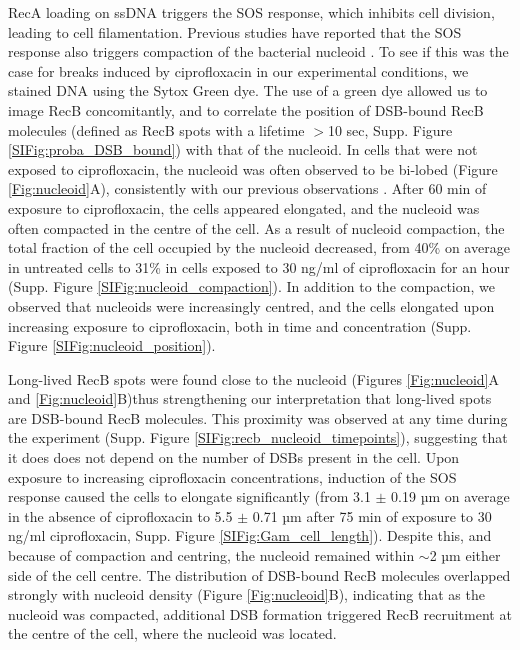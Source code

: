 RecA loading on ssDNA triggers the SOS response, which inhibits cell division, leading to cell filamentation. Previous studies have reported that the SOS response also triggers compaction of the bacterial nucleoid \cite{Odsbu2014}. To see if this was the case for breaks induced by ciprofloxacin in our experimental conditions, we stained DNA using the Sytox Green dye. The use of a green dye allowed us to image RecB concomitantly, and to correlate the position of DSB-bound RecB molecules (defined as RecB spots with a lifetime $>$10 sec, Supp. Figure \ref{SIFig:proba_DSB_bound}) with that of the nucleoid. In cells that were not exposed to ciprofloxacin, the nucleoid was often observed to be bi-lobed (Figure \ref{Fig:nucleoid}A), consistently with our previous observations \cite{Lepore2025}. After 60 min of exposure to ciprofloxacin, the cells appeared elongated, and the nucleoid was often compacted in the centre of the cell. As a result of nucleoid compaction, the total fraction of the cell occupied by the nucleoid decreased, from 40\% on average in untreated cells to 31\% in cells exposed to 30 ng/ml of ciprofloxacin for an hour (Supp. Figure \ref{SIFig:nucleoid_compaction}). In addition to the compaction, we observed that nucleoids were increasingly centred, and the cells elongated upon increasing exposure to ciprofloxacin, both in time and concentration (Supp. Figure \ref{SIFig:nucleoid_position}).

Long-lived RecB spots were found close to the nucleoid (Figures \ref{Fig:nucleoid}A and \ref{Fig:nucleoid}B)thus strengthening our interpretation that long-lived spots are DSB-bound RecB molecules. This proximity was observed at any time during the experiment (Supp. Figure \ref{SIFig:recb_nucleoid_timepoints}), suggesting that it does does not depend on the number of DSBs present in the cell. Upon exposure to increasing ciprofloxacin concentrations, induction of the SOS response caused the cells to elongate significantly (from 3.1 $\pm$ 0.19 µm on average in the absence of ciprofloxacin to 5.5 $\pm$ 0.71 µm after 75 min of exposure to 30 ng/ml ciprofloxacin, Supp. Figure \ref{SIFig:Gam_cell_length}). Despite this, and because of compaction and centring, the nucleoid remained within $\sim$2 µm either side of the cell centre. The distribution of DSB-bound RecB molecules overlapped strongly with nucleoid density (Figure \ref{Fig:nucleoid}B), indicating that as the nucleoid was compacted, additional DSB formation triggered RecB recruitment at the centre of the cell, where the nucleoid was located.

